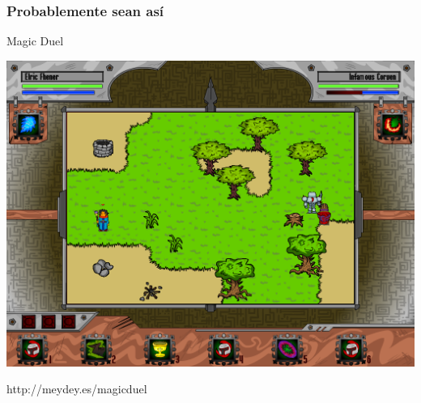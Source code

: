 \begin{frame}
	\frametitle{Probablemente sean así}

	\begin{center}
	Magic Duel
	
	    \includegraphics[scale=0.22]{img/magicduel.png}
	    
	http://meydey.es/magicduel
	\end{center}
\end{frame}

